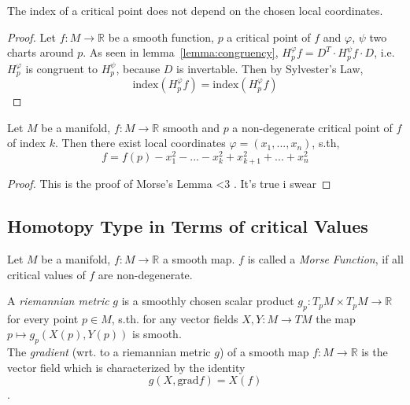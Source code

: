 \documentclass[a4paper,11pt]{article}
\begin{document}
\begin{lemma}
   \label{lemma:index}
   The index of a critical point does not depend on the chosen local coordinates.
\end{lemma}

\begin{proof}
   Let $f: M \rightarrow \mathbb{R}$ be a smooth function, $p$ a critical point of $f$
   and $\varphi$, $\psi$ two charts around $p$.
   As seen in lemma~\ref{lemma:congruency}, $H_p^{\varphi}f = D^T \cdot H_p^{\psi}f \cdot D$, i.e.
   $H_p^{\varphi}$ is congruent to $H_p^{\psi}$, because $D$ is invertable. Then by Sylvester's Law, 
   \[ \text{{index}}(H_p^{\varphi}f) = \text{{index}}(H_p^{\varphi}f) \]
\end{proof}

\begin{theorem}
   \label{theorem:morse lemma}

   Let $M$ be a manifold, $f: M \rightarrow \mathbb{R}$ smooth and $p$ a non-degenerate 
   critical point of $f$ of index $k$. Then there exist local coordinates $\varphi = (x_1, ..., x_n)$, s.th,
   \[ f = f(p) - x_1^2 - ... - x_k^2 + x_{k+1}^2 + ... + x_n^2 \]
\end{theorem}

\begin{proof}
   This is the proof of Morse's Lemma <3 . It's true i swear
\end{proof}

\subsection{Homotopy Type in Terms of critical Values}

\begin{definition}
   \label{def:morse function}

   Let $M$ be a manifold, $f:M \rightarrow \mathbb{R}$ a smooth map. $f$ is called a \textit{Morse Function},
   if all critical values of $f$ are non-degenerate.   
\end{definition}

\begin{definition}
   \label{def:riemannian metric, grad}
   A \textit{riemannian metric} $g$ is a smoothly chosen scalar product $g_p: T_pM \times T_pM \rightarrow \mathbb{R}$
   for every point $p \in M$, s.th. for any vector fields $ X, Y: M \rightarrow TM $ the map 
   $ p \mapsto g_p(X(p), Y(p)) $ is smooth. \\
   The \textit{gradient} (wrt. to a riemannian metric $g$) of a smooth map $f: M \rightarrow \mathbb{R}$ is the vector field
   which is characterized by the identity 
   \[ g(X, \text{grad} f) = X(f) \] .
\end{definition}
\end{document}
